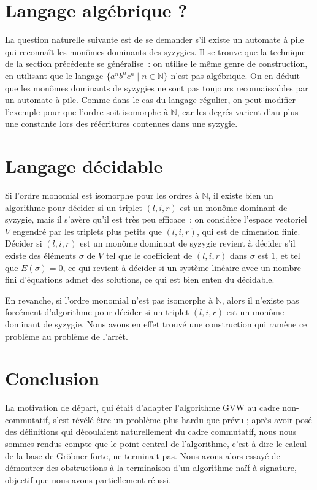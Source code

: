 \documentclass{article}
\newcommand{\N}{\mathbb{N}}
\begin{document}
\section*{Langage algébrique ?}

La question naturelle suivante est de se demander s'il existe un automate à pile qui reconnaît les monômes dominants des syzygies.
Il se trouve que la technique de la section précédente se généralise~: on utilise le même genre de construction, en utilisant que le langage $\{a^nb^nc^n \;|\; n \in \N\}$ n'est pas algébrique.
On en déduit que les monômes dominants de syzygies ne sont pas toujours reconnaissables par un automate à pile. Comme dans le cas du langage régulier, on peut modifier l'exemple pour que l'ordre soit isomorphe à $\N$, car les degrés varient d'au plus une constante lors des réécritures contenues dans une syzygie.

\section*{Langage décidable}

Si l'ordre monomial est isomorphe pour les ordres à $\N$, il existe bien un algorithme pour décider si un triplet $(l, i, r)$ est un monôme dominant de syzygie, mais il s'avère qu'il est très peu efficace~:
on considère l'espace vectoriel $V$ engendré par les triplets plus petits que $(l, i, r)$, qui est de dimension finie.
Décider si $(l, i, r)$ est un monôme dominant de syzygie revient à décider s'il existe des éléments $\sigma$ de $V$ tel que le coefficient de $(l, i, r)$ dans $\sigma$ est $1$, et tel que $E(\sigma) = 0$, ce qui revient à décider si un système linéaire avec un nombre fini d'équations admet des solutions, ce qui est bien enten		du décidable.

En revanche, si l'ordre monomial n'est pas isomorphe à $\N$, alors il n'existe pas forcément d'algorithme pour décider si un triplet $(l, i, r)$ est un monôme dominant de syzygie. Nous avons en effet trouvé une construction qui ramène ce problème au problème de l'arrêt.

\section*{Conclusion}

La motivation de départ, qui était d'adapter l'algorithme GVW au cadre non-commutatif, s'est révélé être un problème plus hardu que prévu ; après avoir posé des définitions qui découlaient naturellement du cadre commutatif, nous nous sommes rendus compte que le point central de l'algorithme, c'est à dire le calcul de la base de Gröbner forte, ne terminait pas. Nous avons alors essayé de démontrer des obstructions à la terminaison d'un algorithme naïf à signature, objectif que nous avons partiellement réussi.
\end{document}
